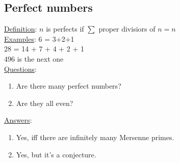 \documentclass[13pt]{article}
\begin{document}
	\subsection*{Perfect numbers}
		\underline{Definition}: $n$ is perfects if $\sum$ proper divisiors of 
			$n = n$\\
		\underline{Examples}: 6 = 3+2+1\\
			28 = 14 + 7 + 4 + 2 + 1\\
			496 is the next one\\
		\underline{Questions}:
			\begin{enumerate}
				\item Are there many perfect numbers?
				\item Are they all even?
			\end{enumerate}
		\underline{Answers}:
			\begin{enumerate}
				\item Yes, iff there are infinitely many Mersenne primes.
				\item Yes, but it's a conjecture.
			\end{enumerate}
\end{document}
